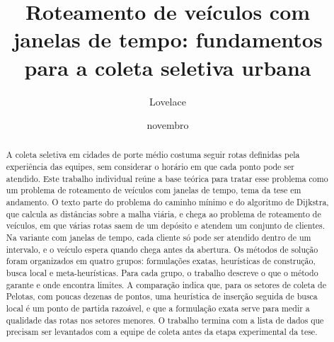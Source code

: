 \documentclass[tid]{texufpel}
\title{Roteamento de veículos com janelas de tempo: fundamentos para a coleta seletiva urbana}
\author{Lovelace}{Ada}                          %
\date{novembro}{2027}
\begin{document}
\renewcommand{\advisorname}{Orientadora}

\maketitle   %


\begin{abstract}
A coleta seletiva em cidades de porte médio costuma seguir rotas definidas
pela experiência das equipes, sem considerar o horário em que cada ponto pode
ser atendido. Este trabalho individual reúne a base teórica para tratar esse
problema como um problema de roteamento de veículos com janelas de tempo, tema
da tese em andamento. O texto parte do problema do caminho mínimo e do
algoritmo de Dijkstra, que calcula as distâncias sobre a malha viária, e chega
ao problema de roteamento de veículos, em que várias rotas saem de um depósito
e atendem um conjunto de clientes. Na variante com janelas de tempo, cada
cliente só pode ser atendido dentro de um intervalo, e o veículo espera quando
chega antes da abertura. Os métodos de solução foram organizados em quatro
grupos: formulações exatas, heurísticas de construção, busca local e
meta-heurísticas. Para cada grupo, o trabalho descreve o que o método garante
e onde encontra limites. A comparação indica que, para os setores de coleta de
Pelotas, com poucas dezenas de pontos, uma heurística de inserção seguida de
busca local é um ponto de partida razoável, e que a formulação exata serve para
medir a qualidade das rotas nos setores menores. O trabalho termina com a lista
de dados que precisam ser levantados com a equipe de coleta antes da etapa
experimental da tese.
\end{abstract}
\end{document}
